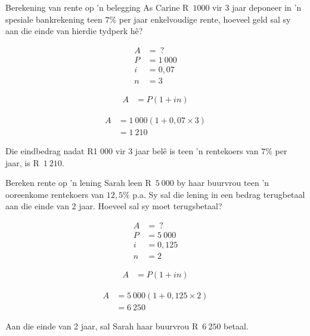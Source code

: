 \begin{wex}{Berekening van rente op 'n belegging}
{As Carine R~$1 000$ vir 3 jaar deponeer
in ’n spesiale bankrekening teen $7\%$ per jaar enkelvoudige rente,
hoeveel geld sal sy aan die einde van hierdie tydperk hê?}
{

    \begin{align*}
	A &= ~?\\
	P &= 1~000\\
	i &= 0,07\\
	n &= 3
    \end{align*}
    
    \begin{align*}
	A &= P(1 + in)
    \end{align*}

    \begin{align*}
	A &= 1~000(1 + 0,07 \times 3)\\
	  &= 1~210
    \end{align*}

    Die eindbedrag nadat R1 000 vir 3 jaar belê is teen ’n rentekoers
van $7\%$ per jaar, is R~$1~210$.
    }
\end{wex}


\begin{wex}{Bereken rente op 'n lening}{
    Sarah leen R~$5~000$ by haar buurvrou teen 'n ooreenkome rentekoers van $12,5\%$ p.a. Sy sal die lening in een bedrag terugbetaal aan die einde van $2$ jaar. Hoeveel sal sy moet terugsbetaal?}{

    \begin{align*}
	A &= ~?\\
	P &= 5~000\\
	i &= 0,125\\
	n &= 2
    \end{align*}

    \begin{align*}
	A &= P(1 + in)
    \end{align*}

    \begin{align*}
	A &= 5~000(1 + 0,125 \times 2)\\
	  &= 6~250
    \end{align*}

    Aan die einde van 2 jaar, sal Sarah haar buurvrou R~$6~250$ betaal.
    }
\end{wex}


